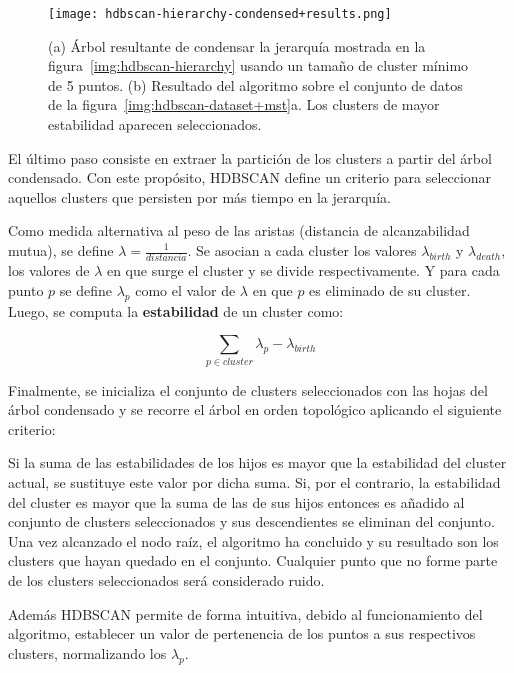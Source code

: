 \begin{figure}[!h]
    \centering
    \texttt{[image: hdbscan-hierarchy-condensed+results.png]}
    \caption{(a) Árbol resultante de condensar la jerarquía mostrada en la figura~\ref{img:hdbscan-hierarchy} usando un tamaño de cluster mínimo de 5 puntos. (b) Resultado del algoritmo sobre el conjunto de datos de la figura~\ref{img:hdbscan-dataset+mst}a.
    Los clusters de mayor estabilidad aparecen seleccionados.}
    \label{img:hdbscan-hierarchy-condensed+results}
\end{figure}

El último paso consiste en extraer la partición de los clusters a partir del árbol condensado.
Con este propósito, HDBSCAN define un criterio para seleccionar aquellos clusters que persisten por más tiempo en la jerarquía.

Como medida alternativa al peso de las aristas (distancia de alcanzabilidad mutua), se define $\lambda=\frac{1}{distancia}$.
Se asocian a cada cluster los valores $\lambda_{birth}$ y $\lambda_{death}$, los valores de $\lambda$ en que surge el cluster y se divide respectivamente.
Y para cada punto $p$ se define $\lambda_p$ como el valor de $\lambda$ en que $p$ es eliminado de su cluster.
Luego, se computa la \textbf{estabilidad} de un cluster como:

\begin{equation*}
    \sum_{p\in cluster}{\lambda_p - \lambda_{birth}}
\end{equation*}

Finalmente, se inicializa el conjunto de clusters seleccionados con las hojas del árbol condensado y se recorre el árbol en orden topológico aplicando el siguiente criterio:

Si la suma de las estabilidades de los hijos es mayor que la estabilidad del cluster actual, se sustituye este valor por dicha suma.
Si, por el contrario, la estabilidad del cluster es mayor que la suma de las de sus hijos entonces es añadido al conjunto de clusters seleccionados y sus descendientes se eliminan del conjunto.
Una vez alcanzado el nodo raíz, el algoritmo ha concluido y su resultado son los clusters que hayan quedado en el conjunto.
Cualquier punto que no forme parte de los clusters seleccionados será considerado ruido.

Además HDBSCAN permite de forma intuitiva, debido al funcionamiento del algoritmo, establecer un valor de pertenencia de los puntos a sus respectivos clusters, normalizando los $\lambda_p$.


